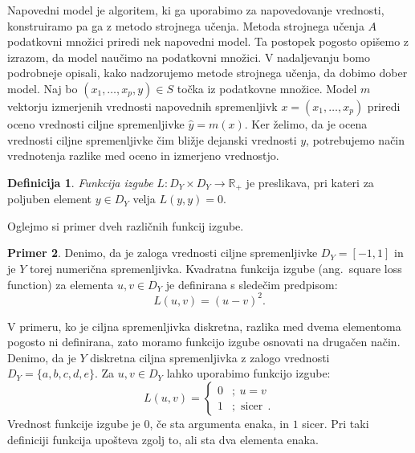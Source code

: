 \documentclass[12pt,a4paper,twoside]{article}
\theoremstyle{definition} %
\newtheorem{definicija}{Definicija}[section]
\newtheorem{primer}[definicija]{Primer}
\theoremstyle{plain} %
\numberwithin{equation}{section}  %
\begin{document}
Napovedni model je algoritem, ki ga uporabimo za napovedovanje vrednosti, konstruiramo pa ga z metodo strojnega učenja.
Metoda strojnega učenja $A$ podatkovni množici priredi nek napovedni model. 
Ta postopek pogosto opišemo z izrazom, da model naučimo na podatkovni množici. %
V nadaljevanju bomo podrobneje opisali, kako nadzorujemo metode strojnega učenja, da dobimo dober model.
Naj bo $(x_1, \ldots, x_p,y) \in S$ točka iz podatkovne množice.
Model $m$ vektorju izmerjenih vrednosti napovednih spremenljivk $x=(x_1, \ldots, x_p)$ priredi oceno vrednosti ciljne spremenljivke $\hat{y}=m(x)$.
Ker želimo, da je ocena vrednosti ciljne spremenljivke čim bližje dejanski vrednosti $y$, potrebujemo način vrednotenja razlike med oceno in izmerjeno vrednostjo.

\begin{definicija}
	\emph{Funkcija izgube} $L: D_Y \times D_Y \rightarrow \mathbb{R}_+$ je preslikava, pri kateri za poljuben element $y \in D_Y$ velja $L(y,y) = 0$.
\end{definicija}

Oglejmo si primer dveh različnih funkcij izgube.

\begin{primer}
Denimo, da je zaloga vrednosti ciljne spremenljivke $D_Y = [-1,1]$ in je $Y$ torej numerična spremenljivka. 
Kvadratna funkcija izgube (ang.~square loss function) za elementa $u, v \in D_Y$ je definirana s sledečim predpisom:
$$
L(u,v) = (u - v)^2.
$$

V primeru, ko je ciljna spremenljivka diskretna, razlika med dvema elementoma pogosto ni definirana, zato moramo funkcijo izgube osnovati na drugačen način. 
Denimo, da je $Y$ diskretna ciljna spremenljivka z zalogo vrednosti $D_Y = \{a,b,c,d,e\}$. 
Za $u, v \in D_Y$ lahko uporabimo funkcijo izgube:
\[
	L(u,v) =
	\begin{cases}
	0 &;\ u= v \\
	1 &; \text{ sicer}\ \ .
	\end{cases}
\]
Vrednost funkcije izgube je $0$, če sta argumenta enaka, in $1$ sicer. 
Pri taki definiciji funkcija upošteva zgolj to, ali sta dva elementa enaka.
\end{primer}
\end{document}
